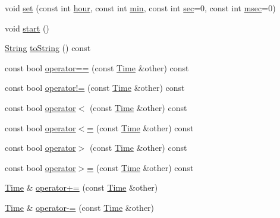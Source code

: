 \begin{DoxyCompactItemize}
void \hyperlink{classprism_1_1_time_a7c67248f8370374686d1a61716b17485}{set} (const int \hyperlink{classprism_1_1_time_a380242e03982df8bf4af3eaa2296c808}{hour}, const int \hyperlink{classprism_1_1_time_afd27e4b1e093fed8253b10090c6090aa}{min}, const int \hyperlink{classprism_1_1_time_a83f655a9c7f1a2e8521ddcb395fa3796}{sec}=0, const int \hyperlink{classprism_1_1_time_a203ccb36ae3f75991b641e282350b280}{msec}=0)
\item 
void \hyperlink{classprism_1_1_time_a504e84942a112509c43c0c09d0441c0c}{start} ()
\item 
\hyperlink{classprism_1_1_string}{String} \hyperlink{classprism_1_1_time_a1bb4fbb063aff43d3640334baaea281d}{to\+String} () const 
\item 
const bool \hyperlink{classprism_1_1_time_a83609d958807bf8256c39881db7002a5}{operator==} (const \hyperlink{classprism_1_1_time}{Time} \&other) const 
\item 
const bool \hyperlink{classprism_1_1_time_aa2aba406dd4de48f602126c0b46a957a}{operator!=} (const \hyperlink{classprism_1_1_time}{Time} \&other) const 
\item 
const bool \hyperlink{classprism_1_1_time_a10289f95ed3569a03cea9ae793dc9a63}{operator$<$} (const \hyperlink{classprism_1_1_time}{Time} \&other) const 
\item 
const bool \hyperlink{classprism_1_1_time_a30638c4a54601a0d7d52b9249060fe6f}{operator$<$=} (const \hyperlink{classprism_1_1_time}{Time} \&other) const 
\item 
const bool \hyperlink{classprism_1_1_time_a4418d7b5578e62a27798cd1df1ddfd3f}{operator$>$} (const \hyperlink{classprism_1_1_time}{Time} \&other) const 
\item 
const bool \hyperlink{classprism_1_1_time_aedf46b0ebca56e0fc141dd07f98c5022}{operator$>$=} (const \hyperlink{classprism_1_1_time}{Time} \&other) const 
\item 
\hyperlink{classprism_1_1_time}{Time} \& \hyperlink{classprism_1_1_time_a0c17a09d0c0899b875588680fb99b92c}{operator+=} (const \hyperlink{classprism_1_1_time}{Time} \&other)
\item 
\hyperlink{classprism_1_1_time}{Time} \& \hyperlink{classprism_1_1_time_acfda18468af0af153873aab3f9a2ec41}{operator-\/=} (const \hyperlink{classprism_1_1_time}{Time} \&other)
\end{DoxyCompactItemize}
